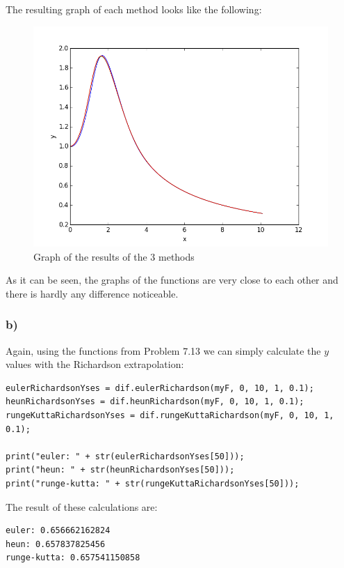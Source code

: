 The resulting graph of each method looks like the following:

\newpage

\begin{figure}[!ht]
\includegraphics[width=1\textwidth]{chapters/images/figure-7-14-a}
\caption{Graph of the results of the 3 methods}
\end{figure}

As it can be seen, the graphs of the functions are very close to each other and there is hardly any difference noticeable.

\subsubsection{b)}

Again, using the functions from Problem 7.13 we can simply calculate the $y$ values with the Richardson extrapolation:

\begin{lstlisting}[caption=Problem 7.14 b)]
eulerRichardsonYses = dif.eulerRichardson(myF, 0, 10, 1, 0.1);
heunRichardsonYses = dif.heunRichardson(myF, 0, 10, 1, 0.1);
rungeKuttaRichardsonYses = dif.rungeKuttaRichardson(myF, 0, 10, 1, 0.1);

print("euler: " + str(eulerRichardsonYses[50]));
print("heun: " + str(heunRichardsonYses[50]));
print("runge-kutta: " + str(rungeKuttaRichardsonYses[50]));
\end{lstlisting}

The result of these calculations are:

\begin{lstlisting}[caption=Result of 7.14 b), keywordstyle=\color{black}]
euler: 0.656662162824
heun: 0.657837825456
runge-kutta: 0.657541150858
\end{lstlisting}

